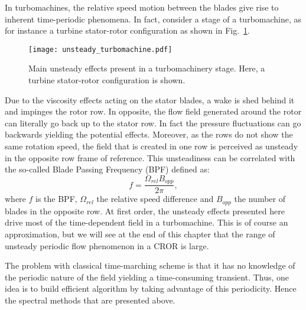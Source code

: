 In turbomachines, the relative speed motion between the blades
give rise to inherent time-periodic phenomena.
In fact, consider a stage of a turbomachine, as for instance
a turbine stator-rotor configuration as shown 
in Fig.~\ref{fig:sm_unsteady_turbomachine}. 
\begin{figure}[htbp]
  \centering
  \texttt{[image: unsteady\_turbomachine.pdf]}
  \caption{Main unsteady effects present in a turbomachinery stage. Here, a turbine stator-rotor
  configuration is shown.}
  \label{fig:sm_unsteady_turbomachine}
\end{figure}
Due to the
viscosity effects acting on the stator blades, 
a wake is shed behind it and 
impinges the rotor row. 
In opposite, the flow field
generated around the rotor can literally go back up
to the stator row. In fact
the pressure fluctuations can go backwards yielding
the potential effects. Moreover, as the rows do not 
show the same rotation speed,
the field that is created in one row is perceived as unsteady in the opposite 
row frame of reference. This unsteadiness can be
correlated with the so-called Blade Passing Frequency (BPF) defined as:
\begin{equation}
	f = \frac{\Omega_{rel} B_{opp}}{2 \pi},
\end{equation}
where $f$ is the BPF, $\Omega_{rel}$ the relative speed difference 
and $B_{opp}$ the number of blades in the opposite row.
At first order, the unsteady effects presented here drive
most of the time-dependent field in a turbomachine. This 
is of course an approximation, but we will see at the end
of this chapter that the range of unsteady periodic
flow phenomenon in a CROR is large.

The problem with classical time-marching scheme is 
that it has no knowledge
of the periodic nature of the field yielding a time-consuming
transient. Thus, one idea is to build efficient algorithm
by taking advantage of this periodicity. 
Hence the spectral methods that are
presented above.

